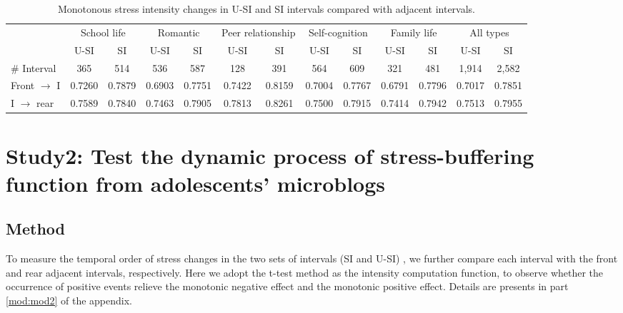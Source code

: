 \begin{table}
\begin{center}
\caption{\small{Monotonous stress intensity changes in U-SI and SI intervals compared with adjacent intervals.}}
\small{
\begin{tabular}{l cccccc cccccc} \\\hline\hline
\multirow{2}{1cm}{}
&\multicolumn{2}{c}{School life}
&\multicolumn{2}{c}{Romantic}
&\multicolumn{2}{c}{Peer relationship}
&\multicolumn{2}{c}{Self-cognition}
&\multicolumn{2}{c}{Family life}
&\multicolumn{2}{c}{All types}\\
&U-SI	    &	SI	        &U-SI	    &SI	        &U-SI	   &SI	
&U-SI	    &	SI	        &	U-SI	&SI	        &U-SI	   &SI\\  \hline
\# Interval         &   365	        &	514	        &	536	        &	587	        &128	    &	391	        &	564	           &	609	            &	321	        &	481	        &	1,914	    &2,582	 \\
Front $\rightarrow$ I &	0.7260 	&	0.7879 	&	0.6903 	&	0.7751 	&	0.7422 	&	0.8159 	&	0.7004 	&	0.7767 	&	0.6791 &	0.7796 	&	0.7017 	&   0.7851\\
I $\rightarrow$ rear  &	0.7589 	&	0.7840 	&	0.7463 	&	0.7905 	&	0.7813 	&	0.8261 	&	0.7500 	&	0.7915 	&	0.7414 	&	0.7942 	&	0.7513 	&   0.7955\\ \hline \hline
\end{tabular}}%
\label{tab:fontrear}
\end{center}
\end{table}


\section{Study2: Test the dynamic process of stress-buffering function from adolescents' microblogs}
\subsection{Method}
\label{sec:temporal}
To measure the temporal order of stress changes in the two sets of intervals (SI and U-SI) ,
we further compare each interval with the front and rear adjacent intervals, respectively.
Here we adopt the t-test method as the intensity computation function,
to observe whether the occurrence of positive events relieve the monotonic negative effect and the monotonic positive effect.
Details are presents in part \ref{mod:mod2} of the appendix.

